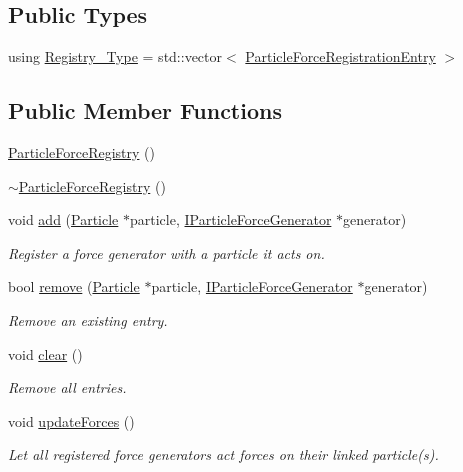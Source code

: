 \subsection*{Public Types}
\begin{DoxyCompactItemize}
\item 
using \mbox{\hyperlink{classr3_1_1_particle_force_registry_ae769e654dbf539cf09c514e47768498c}{Registry\+\_\+\+Type}} = std\+::vector$<$ \mbox{\hyperlink{structr3_1_1_particle_force_registry_1_1_particle_force_registration_entry}{Particle\+Force\+Registration\+Entry}} $>$
\end{DoxyCompactItemize}
\subsection*{Public Member Functions}
\begin{DoxyCompactItemize}
\item 
\mbox{\hyperlink{classr3_1_1_particle_force_registry_a4ca245fb0538dbfb0c04ca49a3a226b6}{Particle\+Force\+Registry}} ()
\item 
\mbox{\hyperlink{classr3_1_1_particle_force_registry_aa1fb5af3138a91474810858e52f5a21c}{$\sim$\+Particle\+Force\+Registry}} ()
\item 
void \mbox{\hyperlink{classr3_1_1_particle_force_registry_a11cb053992645af9af2ccd5f98783cae}{add}} (\mbox{\hyperlink{classr3_1_1_particle}{Particle}} $\ast$particle, \mbox{\hyperlink{classr3_1_1_i_particle_force_generator}{I\+Particle\+Force\+Generator}} $\ast$generator)
\begin{DoxyCompactList}\small\item\em Register a force generator with a particle it acts on. \end{DoxyCompactList}\item 
bool \mbox{\hyperlink{classr3_1_1_particle_force_registry_aa4aa0458e212f63a7a9248318fee1016}{remove}} (\mbox{\hyperlink{classr3_1_1_particle}{Particle}} $\ast$particle, \mbox{\hyperlink{classr3_1_1_i_particle_force_generator}{I\+Particle\+Force\+Generator}} $\ast$generator)
\begin{DoxyCompactList}\small\item\em Remove an existing entry. \end{DoxyCompactList}\item 
void \mbox{\hyperlink{classr3_1_1_particle_force_registry_ac49c38fa041447278c56e68c6e796d77}{clear}} ()
\begin{DoxyCompactList}\small\item\em Remove all entries. \end{DoxyCompactList}\item 
void \mbox{\hyperlink{classr3_1_1_particle_force_registry_ac6a25ff71844b3655efe449b5144fdc5}{update\+Forces}} ()
\begin{DoxyCompactList}\small\item\em Let all registered force generators act forces on their linked particle(s). \end{DoxyCompactList}\end{DoxyCompactItemize}
